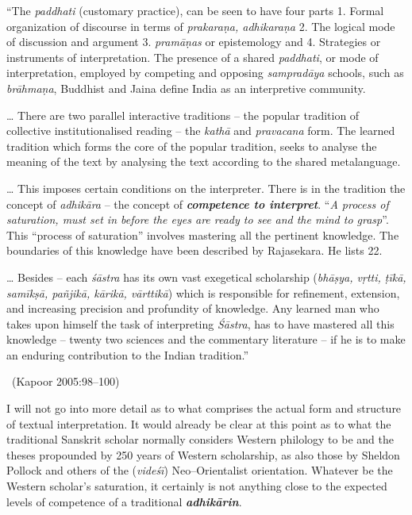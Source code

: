 \begin{myquote}
“The \textit{paddhati} (customary practice), can be seen to have four parts 1. Formal organization of discourse in terms of \textit{prakaraṇa, adhikaraṇa} 2. The logical mode of discussion and argument 3. \textit{pramāṇas} or epistemology and 4. Strategies or instruments of interpretation. The presence of a shared \textit{paddhati}, or mode of interpretation, employed by competing and opposing \textit{sampradāya} schools, such as \textit{brāhmaṇa}, Buddhist and Jaina define India as an interpretive community.
\end{myquote}

\begin{myquote}
… There are two parallel interactive traditions – the popular tradition of collective institutionalised reading – the \textit{kathā} and \textit{pravacana} form. The learned tradition which forms the core of the popular tradition, seeks to analyse the meaning of the text by analysing the text according to the shared metalanguage.
\end{myquote}

\begin{myquote}
… This imposes certain conditions on the interpreter. There is in the tradition the concept of \textit{adhikāra} – the concept of \textbf{\textit{competence to interpret}}. “\textit{A process of saturation, must set in before the eyes are ready to see and the mind to grasp}”. This “process of saturation” involves mastering all the pertinent knowledge. The boundaries of this knowledge have been described by Rajasekara. He lists 22.
\end{myquote}

\begin{myquote}
… Besides – each \textit{śāstra} has its own vast exegetical scholarship (\textit{bhāṣya, vṛtti, ṭīkā, samīkṣā, pañjikā, kārikā, vārttikā}) which is responsible for refinement, extension, and increasing precision and profundity of knowledge. Any learned man who takes upon himself the task of interpreting \textit{Śāstra}, has to have mastered all this knowledge – twenty two sciences and the commentary literature – if he is to make an enduring contribution to the Indian tradition.”

~\hfill (Kapoor 2005:98–100)
\end{myquote}

I will not go into more detail as to what comprises the actual form and structure of textual interpretation. It would already be clear at this point as to what the traditional Sanskrit scholar normally considers Western philology to be and the theses propounded by 250 years of Western scholarship, as also those by Sheldon Pollock and others of the (\textit{videśī}) Neo–Orientalist orientation. Whatever be the Western scholar’s saturation, it certainly is not anything close to the expected levels of competence of a traditional \textbf{\textit{adhikārin}}.

